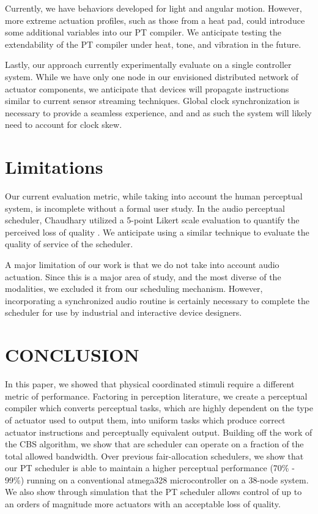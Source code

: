 \documentclass{sigchi}
\begin{document}
  Currently, we have behaviors developed for light and angular motion. However, more extreme actuation profiles, such as those from a heat pad, could introduce some additional variables into our PT compiler. We anticipate testing the extendability of the PT compiler under heat, tone, and vibration in the future. 

  Lastly, our approach currently experimentally evaluate on a single controller system. While we have only one node in our envisioned distributed network of actuator components, we anticipate that devices will propagate instructions similar to current sensor streaming techniques. Global clock synchronization is necessary to provide a seamless experience, and and as such the system will likely need to account for clock skew. 

 \section{Limitations}
  Our current evaluation metric, while taking into account the human perceptual system, is incomplete without a formal user study. In the audio perceptual scheduler, Chaudhary utilized a 5-point Likert scale evaluation to quantify the perceived loss of quality \cite{chaudhary_perceptual_2001}. We anticipate using a similar technique to evaluate the quality of service of the scheduler. 

  A major limitation of our work is that we do not take into account audio actuation. Since this is a major area of study, and the most diverse of the modalities, we excluded it from our scheduling mechanism. However, incorporating a synchronized audio routine is certainly necessary to complete the scheduler for use by industrial and interactive device designers.


  \section{CONCLUSION}
  In this paper, we showed that physical coordinated stimuli require a different metric of performance. Factoring in perception literature, we create a perceptual compiler which converts perceptual tasks, which are highly dependent on the type of actuator used to output them, into uniform tasks which produce correct actuator instructions and perceptually equivalent output. Building off the work of the CBS algorithm, we show that are scheduler can operate on a fraction of the total allowed bandwidth.  Over previous fair-allocation schedulers, we show that our PT scheduler is able to maintain a higher perceptual performance (70\% - 99\%) running on a conventional atmega328 microcontroller on a 38-node system. We also show through simulation that the PT scheduler allows control of up to an orders of magnitude more actuators with an acceptable loss of quality. 
\end{document}
